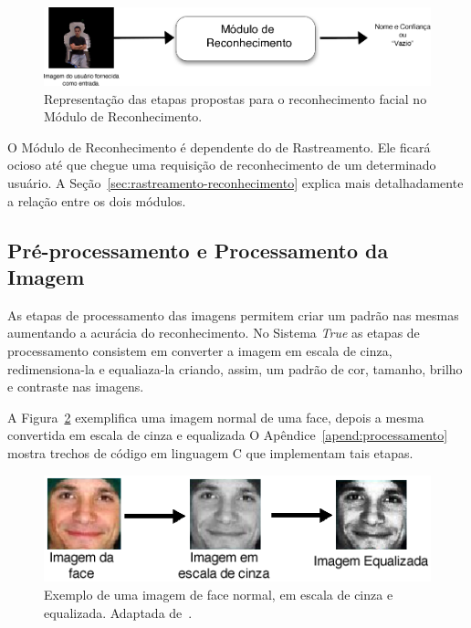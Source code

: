 		\begin{figure}[hbt]
			\begin{center}
				\includegraphics[scale=2.0]{figuras/4.ProblemaEProposta/reconhecimento-simples.png}
			\end{center}
			\caption{Representação das etapas propostas para o reconhecimento facial no Módulo de Reconhecimento.}
			\label{fig:processo-reconhecimento}
		\end{figure}

	O Módulo de Reconhecimento é dependente do de Rastreamento. Ele ficará ocioso até que chegue uma requisição de reconhecimento de um determinado usuário. A Seção~\ref{sec:rastreamento-reconhecimento} explica mais detalhadamente a relação entre os dois módulos.

	\subsection{Pré-processamento e Processamento da Imagem}
		
		As etapas de processamento das imagens permitem criar um padrão nas mesmas aumentando a acurácia do reconhecimento. No Sistema \textit{True} as etapas de processamento consistem em converter a imagem em escala de cinza, redimensiona-la e equaliaza-la criando, assim, um padrão de cor, tamanho, brilho e contraste nas imagens.

		A Figura~\ref{fig:greyscale} exemplifica uma imagem normal de uma face, depois a mesma convertida em escala de cinza e equalizada O Apêndice~\ref{apend:processamento} mostra trechos de código em linguagem C que implementam tais etapas.

		\begin{figure}[hbt]
			\begin{center}
				\includegraphics[scale=0.7]{figuras/4.ProblemaEProposta/greyscale.png}
			\end{center}
			\caption{Exemplo de uma imagem de face normal, em escala de cinza e equalizada. Adaptada de~\cite{shervin}.}
			\label{fig:greyscale}
		\end{figure}

